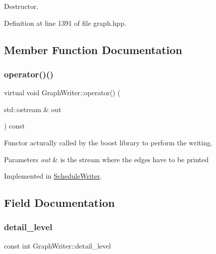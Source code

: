 Destructor. 



Definition at line 1391 of file graph.\+hpp.



\subsection{Member Function Documentation}
\mbox{\label{classGraphWriter_ae5b82438e8bf837f7a0f05b9df648b69}} 
\subsubsection{\texorpdfstring{operator()()}{operator()()}}
{\footnotesize\ttfamily virtual void Graph\+Writer\+::operator() (\begin{DoxyParamCaption}\item[{std\+::ostream \&}]{out }\end{DoxyParamCaption}) const\hspace{0.3cm}{\ttfamily [pure virtual]}}



Functor acturally called by the boost library to perform the writing. 


\begin{DoxyParams}{Parameters}
{\em out} & is the stream where the edges have to be printed \\
\hline
\end{DoxyParams}


Implemented in \hyperlink{classScheduleWriter_a31d2744418a5d0fa5fa1ac01acde3052}{Schedule\+Writer}.



\subsection{Field Documentation}
\mbox{\label{classGraphWriter_a3e641e437697cddd0c2180b24a0a41cd}} 
\subsubsection{\texorpdfstring{detail\+\_\+level}{detail\_level}}
{\footnotesize\ttfamily const int Graph\+Writer\+::detail\+\_\+level\hspace{0.3cm}{\ttfamily [protected]}}



